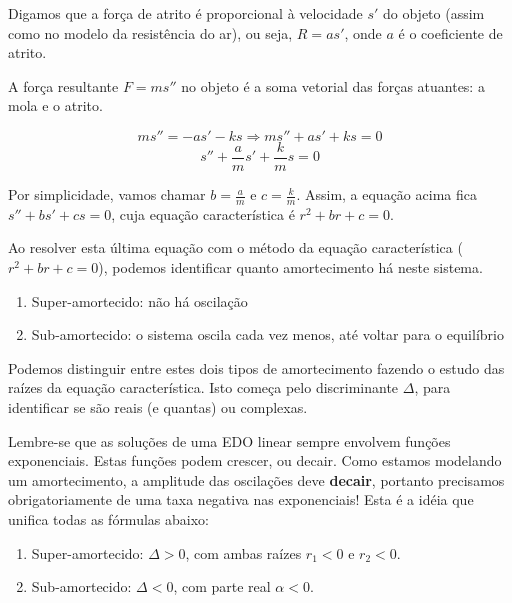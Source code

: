 \documentclass[a4paper]{article}
\begin{document}
Digamos que a força de atrito é proporcional à velocidade $s'$ do
objeto (assim como no modelo da resistência do ar), ou seja, $R=as'$,
onde $a$ é o coeficiente de atrito.%

A força resultante $F=ms''$ no objeto é a soma vetorial das forças
atuantes: a mola e o atrito.

\begin{displaymath}
  ms'' = -as' -ks \Rightarrow   ms'' +as' + ks =0
\end{displaymath}
\begin{displaymath}
  s'' +\frac{a}{m}s' + \frac{k}{m}s  =0
\end{displaymath}

Por simplicidade, vamos chamar $b=\frac{a}{m}$ e
$c=\frac{k}{m}$. Assim, a equação acima fica $s''+bs'+cs=0$, cuja
equação característica é $r^2+br+c=0$.

Ao resolver esta última equação com o método da equação característica
($r^2+br+c=0$), podemos identificar quanto amortecimento há neste sistema.

\begin{enumerate}
\item Super-amortecido: não há oscilação
\item Sub-amortecido: o sistema oscila cada vez menos, até voltar para
  o equilíbrio
\end{enumerate}

Podemos distinguir entre estes dois tipos de amortecimento fazendo o
estudo das raízes da equação característica. Isto começa pelo
discriminante $\Delta$, para identificar se são reais (e quantas) ou
complexas.

Lembre-se que as soluções de uma EDO linear sempre envolvem funções
exponenciais. Estas funções podem crescer, ou decair. Como estamos
modelando um amortecimento, a amplitude das oscilações deve {\bf
  decair}, portanto precisamos obrigatoriamente de uma taxa negativa
nas exponenciais! Esta é a idéia que unifica todas as fórmulas abaixo:

\begin{enumerate}
\item Super-amortecido: $\Delta>0$, com ambas raízes $r_1<0$ e
  $r_2<0$.
\item Sub-amortecido: $\Delta<0$, com parte real $\alpha<0$.
\end{enumerate}
\end{document}
